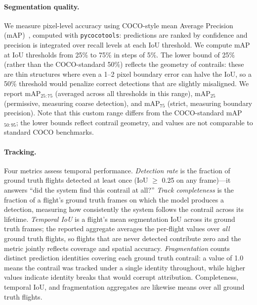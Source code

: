 \documentclass[review]{elsarticle}
\begin{document}
\paragraph{Segmentation quality.} We measure pixel-level accuracy using COCO-style mean Average Precision (mAP)~\cite{lin2014coco}, computed with \texttt{pycocotools}: predictions are ranked by confidence and precision is integrated over recall levels at each IoU threshold. We compute mAP at IoU thresholds from 25\% to 75\% in steps of 5\%. The lower bound of 25\% (rather than the COCO-standard 50\%) reflects the geometry of contrails: these are thin structures where even a 1--2 pixel boundary error can halve the IoU, so a 50\% threshold would penalize correct detections that are slightly misaligned. We report mAP$_{25{:}75}$ (averaged across all thresholds in this range), mAP$_{25}$ (permissive, measuring coarse detection), and mAP$_{75}$ (strict, measuring boundary precision). Note that this custom range differs from the COCO-standard mAP$_{50{:}95}$; the lower bounds reflect contrail geometry, and values are not comparable to standard COCO benchmarks.

\paragraph{Tracking.} Four metrics assess temporal performance. \emph{Detection rate} is the fraction of ground truth flights detected at least once (IoU $\geq$ 0.25 on any frame)---it answers ``did the system find this contrail at all?'' \emph{Track completeness} is the fraction of a flight's ground truth frames on which the model produces a detection, measuring how consistently the system follows the contrail across its lifetime. \emph{Temporal IoU} is a flight's mean segmentation IoU across its ground truth frames; the reported aggregate averages the per-flight values over \emph{all} ground truth flights, so flights that are never detected contribute zero and the metric jointly reflects coverage and spatial accuracy. \emph{Fragmentation} counts distinct prediction identities covering each ground truth contrail: a value of 1.0 means the contrail was tracked under a single identity throughout, while higher values indicate identity breaks that would corrupt attribution. Completeness, temporal IoU, and fragmentation aggregates are likewise means over all ground truth flights.
\end{document}
